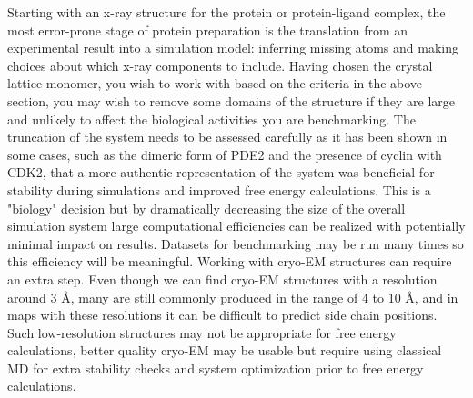 \documentclass[9pt,bestpractices]{livecoms}
\begin{document}
Starting with an x-ray structure for the protein or protein-ligand complex, the most error-prone stage of protein preparation is the translation from an experimental result into a simulation model: inferring missing atoms and making choices about which x-ray components to include. Having chosen the crystal lattice monomer, you wish to work with based on the criteria in the above section, you may wish to remove some domains of the structure if they are large and unlikely to affect the biological activities you are benchmarking. The truncation of the system needs to be assessed carefully as it has been shown in some cases, such as the dimeric form of PDE2 and the presence of cyclin with CDK2, that a more authentic representation of the system was beneficial for stability during simulations and improved free energy calculations. This is a "biology" decision but by dramatically decreasing the size of the overall simulation system large computational efficiencies can be realized with potentially minimal impact on results. Datasets for benchmarking may be run many times so this efficiency will be meaningful. Working with cryo-EM structures can require an extra step. Even though we can find cryo-EM structures with a resolution around 3 Å, many are still commonly produced in the range of 4 to 10 Å, and in maps with these resolutions it can be difficult to predict side chain positions. Such low-resolution structures may not be appropriate for free energy calculations, better quality cryo-EM may be usable but require using classical MD for extra stability checks and system optimization prior to free energy calculations.
\end{document}
